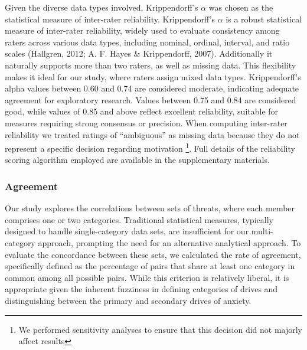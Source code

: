 \documentclass[
  man,floatsintext]{apa7}
\begin{document}
Given the diverse data types involved, Krippendorff's \(\alpha\) was chosen as the statistical measure of inter-rater reliability.
Krippendorff's \(\alpha\) is a robust statistical measure of inter-rater reliability, widely used to evaluate consistency among raters across various data types, including nominal, ordinal, interval, and ratio scales (Hallgren, 2012; A. F. Hayes \& Krippendorff, 2007).
Additionally it naturally supports more than two raters, as well as missing data.
This flexibility makes it ideal for our study, where raters assign mixed data types.
Krippendorff's alpha values between 0.60 and 0.74 are considered moderate, indicating adequate agreement for exploratory research.
Values between 0.75 and 0.84 are considered good, while values of 0.85 and above reflect excellent reliability, suitable for measures requiring strong consensus or precision.
When computing inter-rater reliability we treated ratings of ``ambiguous'' as missing data because they do not represent a specific decision regarding motivation
\footnote{We performed sensitivity analyses to ensure that this decision did not majorly affect results}.
Full details of the reliability scoring algorithm employed are available in the supplementary materials.

\subsubsection{Agreement}\label{agreement}

Our study explores the correlations between sets of threats, where each member comprises one or two categories.
Traditional statistical measures, typically designed to handle single-category data sets, are insufficient for our multi-category approach, prompting the need for an alternative analytical approach.
To evaluate the concordance between these sets, we calculated the rate of agreement, specifically defined as the percentage of pairs that share at least one category in common among all possible pairs.
While this criterion is relatively liberal, it is appropriate given the inherent fuzziness in defining categories of drives and distinguishing between the primary and secondary drives of anxiety.
\end{document}
